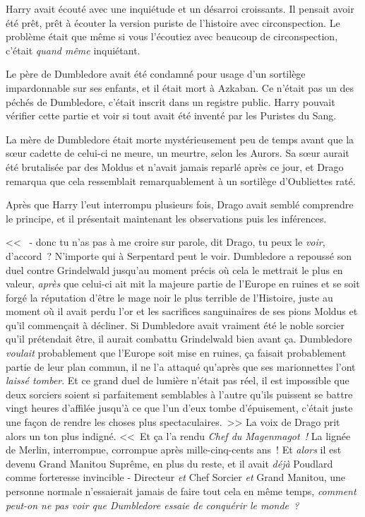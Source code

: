 Harry avait écouté avec une inquiétude et un désarroi croissants. Il pensait avoir été prêt, prêt à écouter la version puriste de l'histoire avec circonspection. Le problème était que même si vous l'écoutiez avec beaucoup de circonspection, c'était \emph{quand même} inquiétant.

Le père de Dumbledore avait été condamné pour usage d'un sortilège impardonnable sur ses enfants, et il était mort à Azkaban. Ce n'était pas un des péchés de Dumbledore, c'était inscrit dans un registre public. Harry pouvait vérifier cette partie et voir si tout avait été inventé par les Puristes du Sang.

La mère de Dumbledore était morte mystérieusement peu de temps avant que la sœur cadette de celui-ci ne meure, un meurtre, selon les Aurors. Sa sœur aurait été brutalisée par des Moldus et n'avait jamais reparlé après ce jour, et Drago remarqua que cela ressemblait remarquablement à un sortilège d'Oubliettes raté.

Après que Harry l'eut interrompu plusieurs fois, Drago avait semblé comprendre le principe, et il présentait maintenant les observations puis les inférences.

<<~ - donc tu n'as pas à me croire sur parole, dit Drago, tu peux le \emph{voir}, d'accord~? N'importe qui à Serpentard peut le voir. Dumbledore a repoussé son duel contre Grindelwald jusqu'au moment précis où cela le mettrait le plus en valeur, \emph{après} que celui-ci ait mit la majeure partie de l'Europe en ruines et se soit forgé la réputation d'être le mage noir le plus terrible de l'Histoire, juste au moment où il avait perdu l'or et les sacrifices sanguinaires de ses pions Moldus et qu'il commençait à décliner. Si Dumbledore avait vraiment été le noble sorcier qu'il prétendait être, il aurait combattu Grindelwald bien avant ça. Dumbledore \emph{voulait} probablement que l'Europe soit mise en ruines, ça faisait probablement partie de leur plan commun, il ne l'a attaqué qu'après que ses marionnettes l'ont \emph{laissé tomber}. Et ce grand duel de lumière n'était pas réel, il est impossible que deux sorciers soient si parfaitement semblables à l'autre qu'ils puissent se battre vingt heures d'affilée jusqu'à ce que l'un d'eux tombe d'épuisement, c'était juste une façon de rendre les choses plus spectaculaires.~>> La voix de Drago prit alors un ton plus indigné. <<~Et ça l'a rendu \emph{Chef du Magenmagot~!} La lignée de Merlin, interrompue, corrompue après mille-cinq-cents ans~! Et \emph{alors} il est devenu Grand Manitou Suprême, en plus du reste, et il avait \emph{déjà} Poudlard comme forteresse invincible - Directeur \emph{et} Chef Sorcier \emph{et} Grand Manitou, une personne normale n'essaierait jamais de faire tout cela en même temps, \emph{comment peut-on ne pas voir que Dumbledore essaie de conquérir le monde~?}

